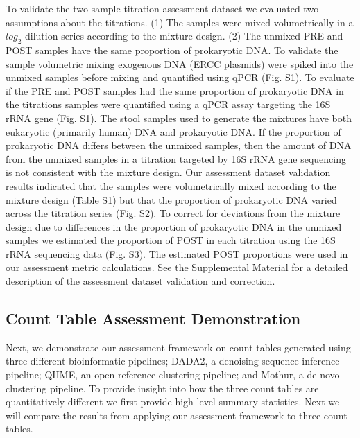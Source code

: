 \documentclass{bmcart}
\begin{document}
To validate the two-sample titration assessment dataset
we evaluated two assumptions about the titrations.
(1) The samples were mixed volumetrically in a
\(log_2\) dilution series according to the mixture design.
(2) The unmixed PRE and POST samples
have the same proportion of prokaryotic DNA.
To validate the sample volumetric mixing exogenous DNA (ERCC plasmids) were spiked into the
unmixed samples before mixing and quantified
using qPCR (Fig. S1). To evaluate if the PRE and POST samples had the same
proportion of prokaryotic DNA in the titrations
samples were quantified using a qPCR assay targeting the 16S rRNA gene (Fig. S1).
The stool samples used to
generate the mixtures have both eukaryotic (primarily human) DNA and
prokaryotic DNA. If the proportion of prokaryotic DNA differs between
the unmixed samples, then the amount of DNA from the unmixed samples in
a titration targeted by 16S rRNA gene sequencing is not consistent with
the mixture design. 
Our assessment dataset validation results indicated that the samples were volumetrically mixed according to the mixture design (Table S1) but that the proportion of prokaryotic DNA varied across the titration series (Fig. S2). 
To correct for deviations from the mixture design due to differences in the proportion of prokaryotic DNA in the unmixed samples we estimated the proportion of POST in each titration using the 16S rRNA sequencing data (Fig. S3). 
The estimated POST proportions were used in our assessment metric calculations. 
See the Supplemental Material for a detailed description of the assessment dataset validation and correction.


\subsection*{Count Table Assessment Demonstration}
Next, we demonstrate our assessment framework on count tables generated using three different bioinformatic pipelines;
DADA2, a denoising sequence inference pipeline;
QIIME, an open-reference clustering pipeline;
and Mothur, a de-novo clustering pipeline.
To provide insight into how the three count tables are quantitatively different we first provide high level summary statistics.
Next we will compare the results from applying our assessment framework to three count tables.
\end{document}
